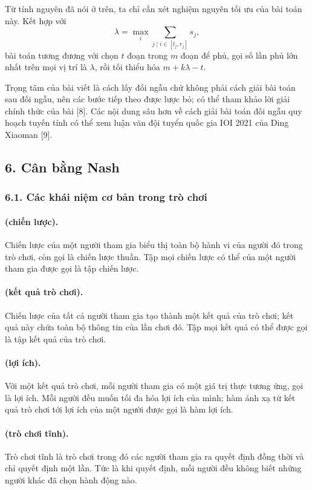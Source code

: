 \documentclass[11pt]{article}
\begin{document}
Từ tính nguyên đã nói ở trên, ta chỉ cần xét nghiệm nguyên tối ưu của bài toán
này. Kết hợp với
\[
  \lambda=\max_i\sum_{j\mid i\in[l_j,r_j]}s_j,
\]
bài toán tương đương với chọn \(t\) đoạn trong \(m\) đoạn để phủ, gọi số lần
phủ lớn nhất trên mọi vị trí là \(\lambda\), rồi tối thiểu hóa \(m+k\lambda-t\).

Trọng tâm của bài viết là cách lấy đối ngẫu chứ không phải cách giải bài toán
sau đối ngẫu, nên các bước tiếp theo được lược bỏ; có thể tham khảo lời giải
chính thức của bài [8]. Các nội dung sâu hơn về cách giải bài toán đối ngẫu
quy hoạch tuyến tính có thể xem luận văn đội tuyển quốc gia IOI 2021 của Ding
Xiaoman [9].

\subsection*{6. Cân bằng Nash}

\subsubsection*{6.1. Các khái niệm cơ bản trong trò chơi}

\paragraph{ (chiến lược).}
Chiến lược của một người tham gia biểu thị toàn bộ hành vi của người đó trong
trò chơi, còn gọi là chiến lược thuần. Tập mọi chiến lược có thể của một người
tham gia được gọi là tập chiến lược.

\paragraph{ (kết quả trò chơi).}
Chiến lược của tất cả người tham gia tạo thành một kết quả của trò chơi; kết
quả này chứa toàn bộ thông tin của lần chơi đó. Tập mọi kết quả có thể được gọi
là tập kết quả của trò chơi.

\paragraph{ (lợi ích).}
Với một kết quả trò chơi, mỗi người tham gia có một giá trị thực tương ứng,
gọi là lợi ích. Mỗi người đều muốn tối đa hóa lợi ích của mình; hàm ánh xạ từ
kết quả trò chơi tới lợi ích của một người được gọi là hàm lợi ích.

\paragraph{ (trò chơi tĩnh).}
Trò chơi tĩnh là trò chơi trong đó các người tham gia ra quyết định đồng thời
và chỉ quyết định một lần. Tức là khi quyết định, mỗi người đều không biết
những người khác đã chọn hành động nào.
\end{document}

